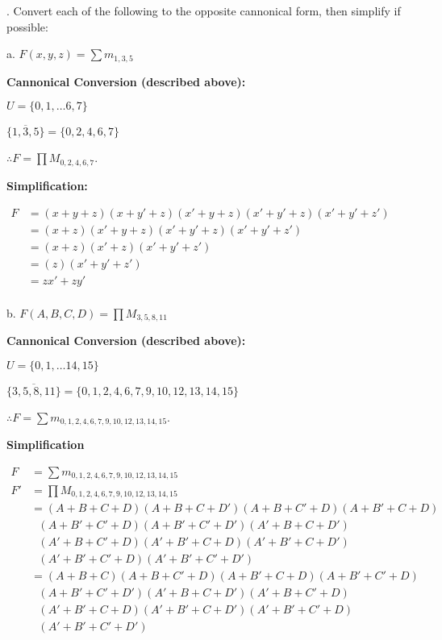 \documentclass[12pt]{book}
\newenvironment{indented}[1] {
	\begin{list}{}{\setlength{\leftmargin}{#1}}
		\item[]
	}{\end{list}}
\begin{document}
	. Convert each of the following to the opposite cannonical form, then simplify if possible:
	\begin{indented}{5mm}
		a. $F(x,y,z) = \sum m_{1, 3, 5}$
		\begin{indented}{5mm}
			\textbf{Cannonical Conversion (described above):}

			$U = \{0, 1, \dots 6, 7\}$

			$\overline{\{1, 3, 5\}} = \{0, 2, 4, 6, 7\}$
			\medskip
			
			$\therefore F = \prod M_{0, 2, 4, 6, 7}$.
			
			\medskip
			\textbf{Simplification:}
			
			$\begin{aligned}
				F &= (x+y+z)(x+y'+z)(x'+y+z)(x'+y'+z)(x'+y'+z')\\
				&= (x+z)(x'+y+z)(x'+y'+z)(x'+y'+z')\\
				&= (x+z)(x'+z)(x'+y'+z')\\
				&= (z)(x'+y'+z')\\
				&= zx' + zy'\\
			\end{aligned}$
		\end{indented}

		b. $F(A,B,C,D) = \prod M_{3, 5, 8, 11}$
		\begin{indented}{5mm}
			\textbf{Cannonical Conversion (described above):}
			
			$U = \{0, 1, \dots 14, 15\}$
			
			$\overline{\{3, 5, 8, 11\}} = \{0, 1, 2, 4, 6, 7, 9, 10, 12, 13, 14, 15\}$
			\medskip
			
			$\therefore F = \sum m_{0, 1, 2, 4, 6, 7, 9, 10, 12, 13, 14, 15}$.
			
			\bigskip
			\textbf{Simplification}
			
			$\begin{aligned}
				F &= \textstyle\sum m_{0, 1, 2, 4, 6, 7, 9, 10, 12, 13, 14, 15}\\
				F'&= \textstyle\prod M_{0, 1, 2, 4, 6, 7, 9, 10, 12, 13, 14, 15}\\
				&= (A+B+C+D)(A+B+C+D')(A+B+C'+D)(A+B'+C+D)\\
				&\text{\ \ \ \ }(A+B'+C'+D)(A+B'+C'+D')(A'+B+C+D')\\
				&\text{\ \ \ \ }(A'+B+C'+D)(A'+B'+C+D)(A'+B'+C+D')\\
				&\text{\ \ \ \ }(A'+B'+C'+D)(A'+B'+C'+D')\\
				&= (A+B+C)(A+B+C'+D)(A+B'+C+D)(A+B'+C'+D)\\
				&\text{\ \ \ \ }(A+B'+C'+D')(A'+B+C+D')(A'+B+C'+D)\\
				&\text{\ \ \ \ }(A'+B'+C+D)(A'+B'+C+D')(A'+B'+C'+D)\\
				&\text{\ \ \ \ }(A'+B'+C'+D')\\
			\end{aligned}$


\end{indented}
\end{indented}
\end{document}
